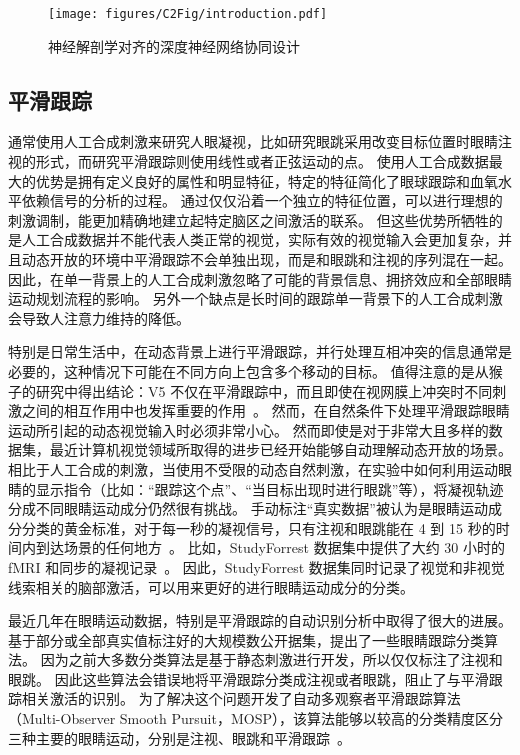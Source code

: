 \begin{figure*}
	\centering
	\texttt{[image: figures/C2Fig/introduction.pdf]}
	\caption{
		神经解剖学对齐的深度神经网络协同设计
	}
	\label{fig:c2:introduction}
\end{figure*}

\subsection{平滑跟踪}
通常使用人工合成刺激来研究人眼凝视，比如研究眼跳采用改变目标位置时眼睛注视的形式，而研究平滑跟踪则使用线性或者正弦运动的点。
使用人工合成数据最大的优势是拥有定义良好的属性和明显特征，特定的特征简化了眼球跟踪和血氧水平依赖信号的分析的过程。
通过仅仅沿着一个独立的特征位置，可以进行理想的刺激调制，能更加精确地建立起特定脑区之间激活的联系。
但这些优势所牺牲的是人工合成数据并不能代表人类正常的视觉，实际有效的视觉输入会更加复杂，并且动态开放的环境中平滑跟踪不会单独出现，而是和眼跳和注视的序列混在一起。
因此，在单一背景上的人工合成刺激忽略了可能的背景信息、拥挤效应和全部眼睛运动规划流程的影响。
另外一个缺点是长时间的跟踪单一背景下的人工合成刺激会导致人注意力维持的降低。

特别是日常生活中，在动态背景上进行平滑跟踪，并行处理互相冲突的信息通常是必要的，这种情况下可能在不同方向上包含多个移动的目标。
值得注意的是从猴子的研究中得出结论：V5 不仅在平滑跟踪中，而且即使在视网膜上冲突时不同刺激之间的相互作用中也发挥重要的作用~\cite{neural_sp}。
然而，在自然条件下处理平滑跟踪眼睛运动所引起的动态视觉输入时必须非常小心。
然而即使是对于非常大且多样的数据集，最近计算机视觉领域所取得的进步已经开始能够自动理解动态开放的场景。
相比于人工合成的刺激，当使用不受限的动态自然刺激，在实验中如何利用运动眼睛的显示指令（比如：“跟踪这个点”、“当目标出现时进行眼跳”等），将凝视轨迹分成不同眼睛运动成分仍然很有挑战。
手动标注“真实数据”被认为是眼睛运动成分分类的黄金标准，对于每一秒的凝视信号，只有注视和眼跳能在 4 到 15 秒的时间内到达场景的任何地方~\cite{gold_standard}。
比如，StudyForrest 数据集中提供了大约 30 小时的 fMRI 和同步的凝视记录~\cite{gaze_forrest}。
因此，StudyForrest 数据集同时记录了视觉和非视觉线索相关的脑部激活，可以用来更好的进行眼睛运动成分的分类。

最近几年在眼睛运动数据，特别是平滑跟踪的自动识别分析中取得了很大的进展。
基于部分或全部真实值标注好的大规模数公开据集，提出了一些眼睛跟踪分类算法\cite{var_natural,dynamic_eye,gold_standard,auto_classification}。
因为之前大多数分类算法是基于静态刺激进行开发，所以仅仅标注了注视和眼跳。
因此这些算法会错误地将平滑跟踪分类成注视或者眼跳，阻止了与平滑跟踪相关激活的识别。
为了解决这个问题开发了自动多观察者平滑跟踪算法（Multi-Observer  Smooth Pursuit，MOSP），该算法能够以较高的分类精度区分三种主要的眼睛运动，分别是注视、眼跳和平滑跟踪~\cite{auto_classification,eye_movement_swap}。

